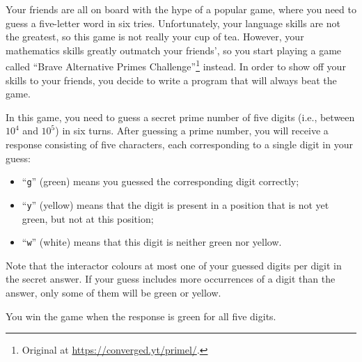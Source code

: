 

\newcommand{\maxn}{1000}
\newcommand{\maxq}{6}

Your friends are all on board with the hype of a popular game,
where you need to guess a five-letter word in six tries.
Unfortunately, your language skills are not the greatest,
so this game is not really your cup of tea.
However, your mathematics skills greatly outmatch your friends',
so you start playing a game called
``Brave Alternative Primes Challenge''\footnote{Original at \url{https://converged.yt/primel/}.} instead.
In order to show off your skills to your friends,
you decide to write a program that will always beat the game.

In this game, you need to guess a secret prime number of five digits (i.e., between $10^4$ and $10^5$) in six turns.
After guessing a prime number, you will receive a response
consisting of five characters,
each corresponding to a single digit in your guess:
\begin{itemize}
    \item ``\texttt{g}'' (green) means you guessed the corresponding digit correctly;
    \item ``\texttt{y}'' (yellow) means that the digit is present in a position that is not yet green, but not at this position;
    \item ``\texttt{w}'' (white) means that this digit is neither green nor yellow.
\end{itemize}
Note that the interactor colours at most one of your guessed digits per digit in the secret answer.
If your guess includes more occurrences of a digit than the answer,
only some of them will be green or yellow.

You win the game when the response is green for all five digits.

